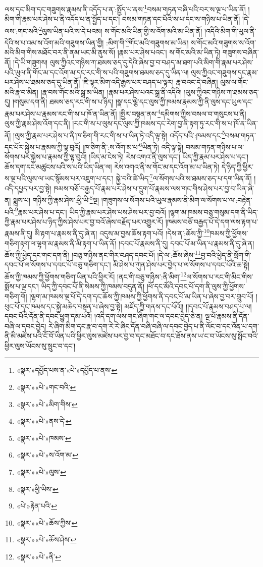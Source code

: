 ལས་དང་མིག་དང་གཟུགས་རྣམས་ནི་འདོད་པ་ན་:སྤྱོད་པ་ནས་\footnote{«སྣར་»དཔྱོད་པས་ན་«པེ་»དཔྱོད་པ་ནས་}བསམ་གཏན་བཞི་པའི་བར་ས་ལྔ་པ་ཡིན་ནོ། །མིག་གི་རྣམ་པར་ཤེས་པ་ནི་འདོད་པ་ན་སྤྱོད་པ་དང་། བསམ་གཏན་དང་པོའི་ས་པ་དང་ས་གཉིས་པ་ཡིན་ནོ། །དེ་ལས་:གང་སའི་\footnote{«སྣར་»«པེ་»གང་བའི་}ལུས་ཡིན་པའི་ས་དེ་པའམ། ས་གོང་མའི་ཡིན་གྱི་ས་འོག་མའི་མ་ཡིན་ནོ། །འདིའི་མིག་གི་ཡུལ་ནི་དེའི་ས་པ་འམ་ས་འོག་མའི་གཟུགས་ཡིན་གྱི། :མིག་གི་\footnote{«སྣར་»«པེ་»མིག་གིས་}གོང་མའི་གཟུགས་མ་ཡིན། ས་གོང་མའི་གཟུགས་ས་འོག་མའི་མིག་གིས་མཐོང་བར་ནི་ནམ་ཡང་མི་ནུས་སོ། །རྣམ་པར་ཤེས་པའང་། ས་གོང་མའི་མ་ཡིན་ཏེ། གཟུགས་བཞིན་ནོ། །དེ་ཡི་གཟུགས། ལུས་ཀྱིའང་གཉིས་ཀ་ཐམས་ཅད་དུ་དེའི་ཞེས་བྱ་བ་བཤད་མ་ཐག་པའི་མིག་གི་རྣམ་པར་ཤེས་པའི་ཡུལ་ནི་གོང་མ་དང་འོག་མ་དང་རང་གི་ས་པའི་གཟུགས་ཐམས་ཅད་དུ་ཡིན་ལ། ལུས་ཀྱིའང་གཟུགས་དང་རྣམ་པར་ཤེས་པ་ཐམས་ཅད་དུ་ཡིན་ནོ། །ཇི་ལྟར་མིག་འདི་རྒྱས་པར་བཤད་པ་ལྟར། རྣ་བའང་དེ་བཞིན། ལུས་ལ་གོང་མའི་རྣ་བ་མིན། །རྣ་བས་གོང་མའི་སྒྲ་མ་ཡིན། །རྣམ་པར་ཤེས་པའང་སྒྲ་ནི་འདིའི། །ལུས་ཀྱིའང་གཉིས་ཀ་ཐམས་ཅད་དུ། །གསུམ་དག་ནི། ཐམས་ཅད་རང་གི་ས་པ་ཉིད། །སྣ་དང་ལྕེ་དང་ལུས་ཀྱི་ཁམས་རྣམས་ཀྱི་ནི་ལུས་དང་ཡུལ་དང་རྣམ་པར་ཤེས་པ་རྣམས་རང་གི་ས་པ་ཁོ་ན་ཡིན་ནོ། །སྤྱིར་བསྟན་ནས་\footnote{«སྣར་»«པེ་»ནས་དེ་}དམིགས་ཀྱིས་བསལ་བ་གསུངས་པ་ནི། ལུས་ཀྱི་རྣམ་ཤེས་འོག་དང་ནི། །རང་གི་ས་པ་ལུས་དང་ལུས་ཀྱི་ཁམས་དང་རེག་བྱ་ནི་རྟག་ཏུ་རང་གི་ས་པ་ཁོ་ན་ཡིན་ནོ། །ལུས་ཀྱི་རྣམ་པར་ཤེས་པ་ནི་ཁ་ཅིག་གི་རང་གི་ས་པ་ཡིན་ཏེ་འདི་ལྟ་སྟེ། འདོད་པའི་:ཁམས་དང་\footnote{«སྣར་»«པེ་»ཁམས་}བསམ་གཏན་དང་པོར་སྐྱེས་པ་རྣམས་ཀྱི་ལྟ་བུའོ། །ཁ་ཅིག་ནི་:ས་འོག་མ་པ་\footnote{«སྣར་»«པེ་»ས་འོག་མ་}ཡིན་ཏེ། འདི་ལྟ་སྟེ། བསམ་གཏན་གཉིས་པ་ལ་སོགས་པར་སྐྱེས་པ་རྣམས་ཀྱི་ལྟ་བུའོ། །ཡིད་མ་ངེས་ཏེ། རེས་འགའ་ནི་ལུས་དང་། ཡིད་ཀྱི་རྣམ་པར་ཤེས་པ་དང་། ཆོས་དག་དང་མཚུངས་པའི་ས་པའི་ཡིད་ཡིན་ལ། རེས་འགའ་ནི་ས་གོང་མ་དང་འོག་མ་པ་ཡིན་ཏེ། དེ་ཉིད་ཀྱི་ཕྱིར་ས་ལྔ་པའི་ལུས་ལ་ཡང་སྙོམས་པར་འཇུག་པ་དང་། སྐྱེ་བའི་ཚེ་ཡིད་\footnote{«སྣར་»«པེ་»ལུས་}ལ་སོགས་པའི་ས་ཐམས་ཅད་པ་དག་ཡིན་ནོ། །འདི་དཔྱད་པར་བྱ་སྟེ། ཁམས་བཅོ་བརྒྱད་པོ་རྣམ་པར་ཤེས་པ་དྲུག་པོ་རྣམས་ལས་གང་གིས་ཤེས་པར་བྱ་བ་ཡིན་ཞེ་ན། སྨྲས་པ། གཉིས་ཀྱི་རྣམ་ཤེས་:ཕྱི་ཡི་\footnote{«སྣར་»ཕྱི་ཡིས་}ལྔ། །གཟུགས་ལ་སོགས་པའི་ཡུལ་རྣམས་ནི་མིག་ལ་སོགས་པ་ལ་:བརྟེན་པའི་\footnote{«པེ་»རྟེན་པའི་}རྣམ་པར་ཤེས་པ་དང་། ཡིད་ཀྱི་རྣམ་པར་ཤེས་པས་ཤེས་པར་བྱ་བའོ། །ལྷག་མ་ཁམས་བཅུ་གསུམ་དག་ནི་ཡིད་ཀྱི་རྣམ་པར་ཤེས་པ་ཉིད་ཀྱིས་ཤེས་པར་བྱ་བའོ་ཞེས་བརྗོད་པར་འགྱུར་རོ། །ཁམས་བཅོ་བརྒྱད་པོ་དེ་དག་ལས་རྟག་པ་རྣམས་ནི་དུ། མི་རྟག་པ་རྣམས་ནི་དུ་ཞེ་ན། འདུས་མ་བྱས་ཆོས་རྟག་པའོ། །དེས་ན་:ཆོས་ཀྱི་\footnote{«སྣར་»«པེ་»ཆོས་ཀྱིས་}ཁམས་ཀྱི་ཕྱོགས་གཅིག་རྟག་ལ་ལྷག་མ་རྣམས་ནི་མི་རྟག་པ་ཡིན་ནོ། །དབང་པོ་རྣམས་ནི་དུ། དབང་པོ་མ་ཡིན་པ་རྣམས་ནི་དུ་ཞེ་ན། ཆོས་ཀྱི་ཕྱེད་དང་གང་དག་ནི། །བཅུ་གཉིས་ནང་གིར་བཤད་དབང་པོ། །དེ་ལ་:ཆོས་ཞེས་\footnote{«སྣར་»«པེ་»ཆོས་ཤེས་}བྱ་བའི་ཕྱེད་ནི་སྲོག་གི་དབང་པོ་ལ་སོགས་པ་དབང་པོ་བཅུ་གཅིག་དང་། མི་ཤེས་པ་ཀུན་ཤེས་པར་བྱེད་པ་ལ་སོགས་པ་དབང་པོའི་ཆ་སྟེ། ཆོས་ཀྱི་ཁམས་ཀྱི་ཕྱོགས་གཅིག་ཡིན་པའི་ཕྱིར་རོ། །ནང་གི་བཅུ་གཉིས་:ནི་མིག་\footnote{«སྣར་»«པེ་»ནི་}ལ་སོགས་པ་རང་གི་མིང་གིས་སྨོས་པ་ལྔ་དང་། ཡིད་ཀྱི་དབང་པོ་ནི་སེམས་ཀྱི་ཁམས་བདུན་ནོ། །ཕོ་དང་མོའི་དབང་པོ་དག་ནི་ལུས་ཀྱི་ཕྱོགས་གཅིག་གོ། །ལྷག་མ་ཁམས་ལྔ་པོ་དེ་དག་དང་ཆོས་ཀྱི་ཁམས་ཀྱི་ཕྱོགས་ནི་དབང་པོ་མ་ཡིན་པ་ཞེས་བྱ་བར་གྲུབ་པོ། །ཕུང་པོ་དང་ཁམས་དང་སྐྱེ་མཆེད་བསྟན་པ་ཞེས་བྱ་སྟེ། མཛོད་ཀྱི་གནས་དང་པོའོ།། །།དབང་པོ་རྣམས་བཤད་པ་ལ། དབང་པོའི་དོན་ནི་དབང་ཕྱུག་དམ་པའོ། །འདི་དག་ལས་གང་ཞིག་གང་ལ་དབང་བྱེད་ཅེ་ན། ལྔ་པོ་རྣམས་ནི་དོན་བཞི་ལ་དབང་བྱེད། རེ་ཞིག་མིག་དང་རྣ་བ་དག་རེ་རེ་ཞིང་དོན་བཞི་བཞི་ལ་དབང་བྱེད་པ་ནི་ལོང་བ་དང་འོན་པ་དག་ནི་མི་མཛེས་པའི་ངོ་བོ་ཡིན་པའི་ཕྱིར་ལུས་མཛེས་པར་བྱ་བ་དང་མཐོང་བ་དང་ཐོས་ནས་ཡ་ང་བ་ཡོངས་སུ་སྤོང་བའི་ཕྱིར་ལུས་ཡོངས་སུ་སྲུང་བ་དང་། 